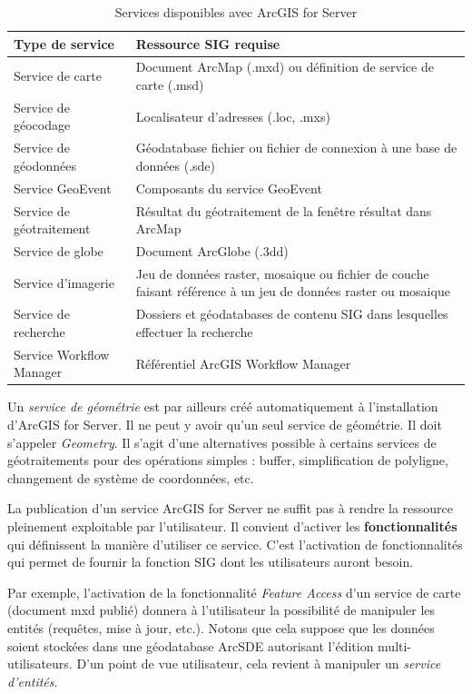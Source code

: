 \documentclass[11pt]{article}
\begin{document}
\begin{table}[H]
	\begin{center}
		{\renewcommand{\arraystretch}{1.3}
		\begin{tabular}{|l|p{7 cm}|}
			\hline 
			\textbf{Type de service} & \textbf{Ressource SIG requise} \\
			\hline
			Service de carte & Document ArcMap (.mxd) ou définition de service de carte (.msd) \\
			Service de géocodage & Localisateur d'adresses (.loc, .mxs) \\
			Service de géodonnées & Géodatabase fichier ou fichier de connexion à une base de données (.sde) \\
			Service GeoEvent & Composants du service GeoEvent \\
			Service de géotraitement & Résultat du géotraitement de la fenêtre résultat dans ArcMap \\
			Service de globe & Document ArcGlobe (.3dd) \\
			Service d'imagerie & Jeu de données raster, mosaique ou fichier de couche faisant référence à un jeu de données raster ou mosaique \\
			Service de recherche & Dossiers et géodatabases de contenu SIG dans lesquelles effectuer  la recherche \\
			Service Workflow Manager & Référentiel ArcGIS Workflow Manager \\
			\hline
		\end{tabular}
	}
	\end{center}
	\caption{Services disponibles avec ArcGIS for Server}
\end{table}

Un \textit{service de géométrie} est par ailleurs créé automatiquement à l'installation d'ArcGIS for Server. Il ne peut y avoir qu'un seul service de géométrie. Il doit s'appeler \textit{Geometry}. Il s'agit d'une alternatives possible à certains services de géotraitements pour des opérations simples : buffer, simplification de polyligne, changement de système de coordonnées, etc. 

La publication d'un service ArcGIS for Server ne suffit pas à rendre la ressource pleinement exploitable par l'utilisateur. Il convient d'activer les \textbf{fonctionnalités} qui définissent la manière d'utiliser ce service. C'est l'activation de fonctionnalités qui permet de fournir la fonction SIG dont les utilisateurs auront besoin.

Par exemple, l'activation de la fonctionnalité \textit{Feature Access} d'un service de carte (document mxd publié) donnera à l'utilisateur la possibilité de manipuler les entités (requêtes, mise à jour, etc.). Notons que cela suppose que les données soient stockées dans une géodatabase ArcSDE autorisant l'édition multi-utilisateurs. D'un point de vue utilisateur, cela revient à manipuler un \textit{service d'entités}.
\end{document}
